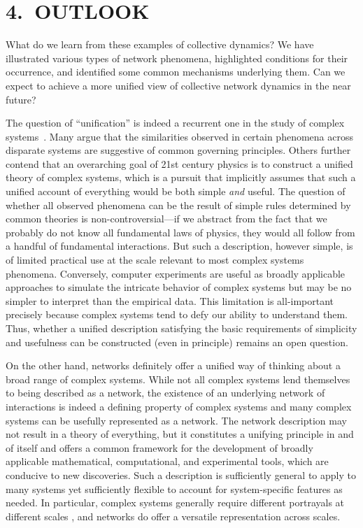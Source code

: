 \documentclass[
preprint,
superscriptaddress,
aps,
prl,
]{revtex4-1}
\begin{document}
\section{4.~OUTLOOK}

What do we learn from these examples  of collective dynamics?
We have illustrated 
{\color{black} various}
types of network
 phenomena, highlighted conditions for their occurrence, and 
identified some common 
{\color{black} mechanisms underlying them.}
Can we {\color{black} expect to} achieve a more unified view 
{\color{black} of}
collective network dynamics in the near future? 

{\color{black}
The question of ``unification'' is indeed a recurrent one in the study of complex systems~\cite{horgan1995complexity}. 
Many argue that the similarities observed in certain phenomena across 
disparate systems are suggestive of common
governing principles.
Others 
further contend 
that an overarching goal of 21st century physics is to construct a unified theory 
of complex systems, which is a pursuit that implicitly assumes that such a unified
account of everything would be both simple {\it and} useful.
The question of whether all observed phenomena can be the result of simple
rules determined by common theories is non-controversial---if we abstract from the fact that we probably do 
not know all fundamental laws of physics, they would all follow from  
a handful of
fundamental 
interactions. But such a description, however simple, is of limited practical
use at the scale relevant to most complex systems phenomena. 
Conversely, computer experiments are useful as broadly applicable approaches to simulate 
the intricate behavior of complex systems but may be no simpler to interpret than the 
empirical data. 
This limitation is all-important
precisely because complex systems tend to
defy  our
ability to understand them. Thus, whether a unified description satisfying the basic 
requirements of simplicity and usefulness can be constructed (even in principle) 
remains
an open question.

On the other hand, networks definitely offer a unified way of thinking about a broad range of 
complex systems. While not all complex systems lend themselves to being described as a network,
the existence of an underlying network of interactions is indeed a defining property of complex systems and 
many complex systems can be usefully represented as a network. 
The network description may not
result in
a theory of everything, but it constitutes a unifying 
principle in and of itself and offers a common framework for the development of broadly
applicable mathematical, computational, and experimental tools, which are 
conducive to 
new discoveries.
Such a description is  sufficiently general to apply to many systems
yet 
sufficiently flexible to account for 
system-specific features as needed. In particular, 
complex systems generally require 
different portrayals
at different scales \cite{anderson1972more}, and networks do offer a versatile representation across scales. 

}
\end{document}
